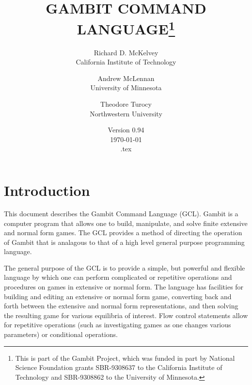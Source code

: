 %
%
%
\renewcommand{\baselinestretch}{.9}
\newcommand{\bd}{\begin{description}}
\newcommand{\ed}{\end{description}}




\title{GAMBIT COMMAND LANGUAGE\thanks{This is part of the Gambit
Project, which was funded in part by National Science Foundation
grants SBR-9308637 to the California Institute of Technology and
SBR-9308862 to the University of Minnesota.}}

\author{Richard D. McKelvey\\California Institute of
Technology
\and
Andrew McLennan\\University of
Minnesota
\and 
Theodore Turocy\\Northwestern University
}

\date{Version 0.94\\ \today\\ \jobname.tex}

\maketitle

\tableofcontents

\section{Introduction}

This document describes the Gambit Command Language (GCL).  Gambit is
a computer program that allows one to build, manipulate, and solve
finite extensive and normal form games. The GCL provides a method of
directing the operation of Gambit that is analagous to that of a high
level general purpose programming language.

The general purpose of the GCL is to provide a simple, but powerful
and flexible language by which one can perform complicated or
repetitive operations and procedures on games in extensive or normal
form.  The language has facilities for building and editing an
extensive or normal form game, converting back and forth between the
extensive and normal form representations, and then solving the
resulting game for various equilibria of interest. Flow
control statements allow for repetitive operations (such as
investigating games as one changes various parameters) or conditional
operations.

